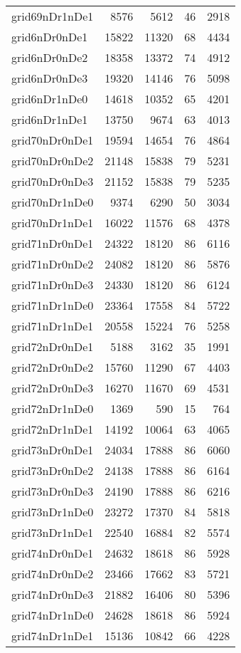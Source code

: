 \begin{tabular}{lrrrr}
grid69nDr1nDe1 & 8576 & 5612 & 46 & 2918 \\
grid6nDr0nDe1 & 15822 & 11320 & 68 & 4434 \\
grid6nDr0nDe2 & 18358 & 13372 & 74 & 4912 \\
grid6nDr0nDe3 & 19320 & 14146 & 76 & 5098 \\
grid6nDr1nDe0 & 14618 & 10352 & 65 & 4201 \\
grid6nDr1nDe1 & 13750 & 9674 & 63 & 4013 \\
grid70nDr0nDe1 & 19594 & 14654 & 76 & 4864 \\
grid70nDr0nDe2 & 21148 & 15838 & 79 & 5231 \\
grid70nDr0nDe3 & 21152 & 15838 & 79 & 5235 \\
grid70nDr1nDe0 & 9374 & 6290 & 50 & 3034 \\
grid70nDr1nDe1 & 16022 & 11576 & 68 & 4378 \\
grid71nDr0nDe1 & 24322 & 18120 & 86 & 6116 \\
grid71nDr0nDe2 & 24082 & 18120 & 86 & 5876 \\
grid71nDr0nDe3 & 24330 & 18120 & 86 & 6124 \\
grid71nDr1nDe0 & 23364 & 17558 & 84 & 5722 \\
grid71nDr1nDe1 & 20558 & 15224 & 76 & 5258 \\
grid72nDr0nDe1 & 5188 & 3162 & 35 & 1991 \\
grid72nDr0nDe2 & 15760 & 11290 & 67 & 4403 \\
grid72nDr0nDe3 & 16270 & 11670 & 69 & 4531 \\
grid72nDr1nDe0 & 1369 & 590 & 15 & 764 \\
grid72nDr1nDe1 & 14192 & 10064 & 63 & 4065 \\
grid73nDr0nDe1 & 24034 & 17888 & 86 & 6060 \\
grid73nDr0nDe2 & 24138 & 17888 & 86 & 6164 \\
grid73nDr0nDe3 & 24190 & 17888 & 86 & 6216 \\
grid73nDr1nDe0 & 23272 & 17370 & 84 & 5818 \\
grid73nDr1nDe1 & 22540 & 16884 & 82 & 5574 \\
grid74nDr0nDe1 & 24632 & 18618 & 86 & 5928 \\
grid74nDr0nDe2 & 23466 & 17662 & 83 & 5721 \\
grid74nDr0nDe3 & 21882 & 16406 & 80 & 5396 \\
grid74nDr1nDe0 & 24628 & 18618 & 86 & 5924 \\
grid74nDr1nDe1 & 15136 & 10842 & 66 & 4228 \\

\end{tabular}
